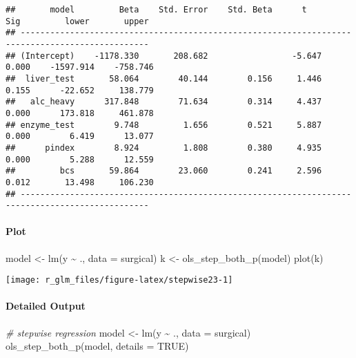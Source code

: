 \documentclass[
]{article}
\newenvironment{Shaded}{\begin{snugshade}}{\end{snugshade}}
\newcommand{\AttributeTok}[1]{\textcolor[rgb]{0.77,0.63,0.00}{#1}}
\newcommand{\CommentTok}[1]{\textcolor[rgb]{0.56,0.35,0.01}{\textit{#1}}}
\newcommand{\ConstantTok}[1]{\textcolor[rgb]{0.00,0.00,0.00}{#1}}
\newcommand{\FunctionTok}[1]{\textcolor[rgb]{0.00,0.00,0.00}{#1}}
\newcommand{\NormalTok}[1]{#1}
\newcommand{\OtherTok}[1]{\textcolor[rgb]{0.56,0.35,0.01}{#1}}
\newcommand{\SpecialCharTok}[1]{\textcolor[rgb]{0.00,0.00,0.00}{#1}}
\begin{document}
\begin{verbatim}
##       model         Beta    Std. Error    Std. Beta      t        Sig         lower       upper 
## ------------------------------------------------------------------------------------------------
## (Intercept)    -1178.330       208.682                 -5.647    0.000    -1597.914    -758.746 
##  liver_test       58.064        40.144        0.156     1.446    0.155      -22.652     138.779 
##   alc_heavy      317.848        71.634        0.314     4.437    0.000      173.818     461.878 
## enzyme_test        9.748         1.656        0.521     5.887    0.000        6.419      13.077 
##      pindex        8.924         1.808        0.380     4.935    0.000        5.288      12.559 
##         bcs       59.864        23.060        0.241     2.596    0.012       13.498     106.230 
## ------------------------------------------------------------------------------------------------
\end{verbatim}

\hypertarget{plot-4}{%
\paragraph{Plot}\label{plot-4}}

\begin{Shaded}
\begin{Highlighting}[]
\NormalTok{model }\OtherTok{\textless{}{-}} \FunctionTok{lm}\NormalTok{(y }\SpecialCharTok{\textasciitilde{}}\NormalTok{ ., }\AttributeTok{data =}\NormalTok{ surgical)}
\NormalTok{k }\OtherTok{\textless{}{-}} \FunctionTok{ols\_step\_both\_p}\NormalTok{(model)}
\FunctionTok{plot}\NormalTok{(k)}
\end{Highlighting}
\end{Shaded}

\begin{center}\texttt{[image: r\_glm\_files/figure-latex/stepwise23-1]} \end{center}

\hypertarget{detailed-output-2}{%
\paragraph{Detailed Output}\label{detailed-output-2}}

\begin{Shaded}
\begin{Highlighting}[]
\CommentTok{\# stepwise regression}
\NormalTok{model }\OtherTok{\textless{}{-}} \FunctionTok{lm}\NormalTok{(y }\SpecialCharTok{\textasciitilde{}}\NormalTok{ ., }\AttributeTok{data =}\NormalTok{ surgical)}
\FunctionTok{ols\_step\_both\_p}\NormalTok{(model, }\AttributeTok{details =} \ConstantTok{TRUE}\NormalTok{)}
\end{Highlighting}
\end{Shaded}
\end{document}
